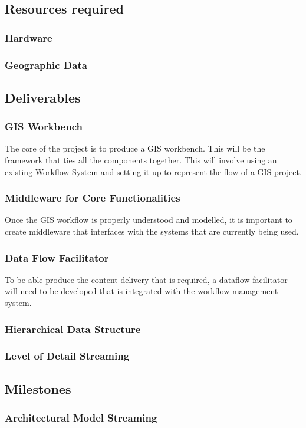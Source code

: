 \documentclass[12pt,a4paper]{article}
\begin{document}
\subsection{Resources required}
\subsubsection*{Hardware}
\subsubsection*{Geographic Data}
\subsection{Deliverables}
\subsubsection{GIS Workbench}
The core of the project is to produce a GIS workbench. This will
be the framework that ties all the components together. This will involve
using an existing Workflow System and setting it up to represent the
flow of a GIS project.
\subsubsection{Middleware for Core Functionalities}
Once the GIS workflow is properly understood and modelled, it is
important to create middleware that interfaces with the systems that are
currently being used.
\subsubsection{Data Flow Facilitator}
To be able produce the content delivery that is required, a dataflow
facilitator will need to be developed that is integrated with the
workflow management system.
\subsubsection{Hierarchical Data Structure}
\subsubsection{Level of Detail Streaming}
\subsection{Milestones}
\subsubsection{Architectural Model Streaming}
\end{document}
